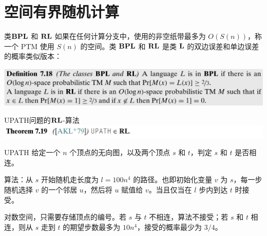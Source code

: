 \documentclass[UTF8,aspectratio=169,mathserif]{beamer}
\begin{document}
	\section{空间有界随机计算}
	\begin{frame}{类$\bf BPL$ 和 $\bf RL$}
		如果在任何计算分支中，使用的非空纸带最多为 $O(S(n))$，称一个 PTM 使用 $S(n)$ 的空间。类 $\bf BPL$ 和 $\bf RL$ 是类 $\bf L$ 的双边误差和单边误差的概率类似版本：\newline
		
		\includegraphics[width=\linewidth]{../../7/note.assets/image-20210509162758560.png}
	\end{frame}

	\begin{frame}{UPATH问题的$\bf RL$-算法}
		\includegraphics[width=\linewidth]{../../7/note.assets/image-20210509163216637.png}
		
		\begin{block}{UPATH}
			给定一个 $n$ 个顶点的无向图，以及两个顶点 $s$ 和 $t$，判定 $s$ 和 $t$ 是否相连。
		\end{block}
		
		算法：从 $s$ 开始随机走长度为 $l=100n^4$ 的路径。也即初始化变量 $v$ 为 $s$，每一步随机选择 $v$ 的一个邻居 $u$，然后将 $u$ 赋值给 $v$。当且仅当在 $l$ 步内到达 $t$ 时接受。\newline
		
		对数空间，只需要存储顶点的编号。若 $s$ 与 $t$ 不相连，算法不接受；若 $s$ 和 $t$ 相连，则从 $s$ 走到 $t$ 的期望步数最多为 $10n^4$，接受的概率最少为 $3/4$。
	\end{frame}
		
\end{document}
